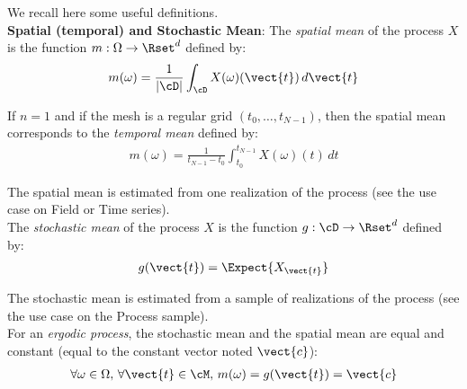 We recall here some useful definitions.\\



{\bf Spatial (temporal) and Stochastic Mean}:
The \emph{spatial mean} of the process $X$ is the function $m: \Omega \rightarrow \Rset^d$ defined by:
\begin{align}\label{spatMean}
  \displaystyle m(\omega)=\frac{1}{|\cD|} \int_{\cD} X(\omega)(\vect{t})\, d\vect{t}
\end{align}

If $n=1$ and if the mesh is a regular grid $(t_0, \dots, t_{N-1})$, then the spatial mean corresponds to the  \emph{temporal mean} defined by:
\begin{align}\label{tempMean}
  m(\omega) =  \frac{1}{t_{N-1} - t_0} \int_{t_0}^{t_{N-1}}X(\omega)(t) \, dt
\end{align}

The spatial mean is estimated from one realization of the process (see the use case on Field or Time series).\\

The  \emph{stochastic mean}  of the process $X$ is the function $g: \cD \rightarrow \Rset^d$ defined by:
\begin{align}\label{stocMean}
  \displaystyle g(\vect{t}) = \Expect{X_{\vect{t}}}
\end{align}

The stochastic mean is estimated from a sample of realizations of the process (see the use case on the Process sample).\\

For an \emph{ergodic process}, the stochastic mean and the spatial mean are equal and constant (equal to the constant vector noted $\vect{c}$):
\begin{align}\label{ergodic}
  \forall \omega\in \Omega, \, \forall \vect{t} \in \cM, \, m(\omega)=  g(\vect{t})  = \vect{c}
\end{align}




